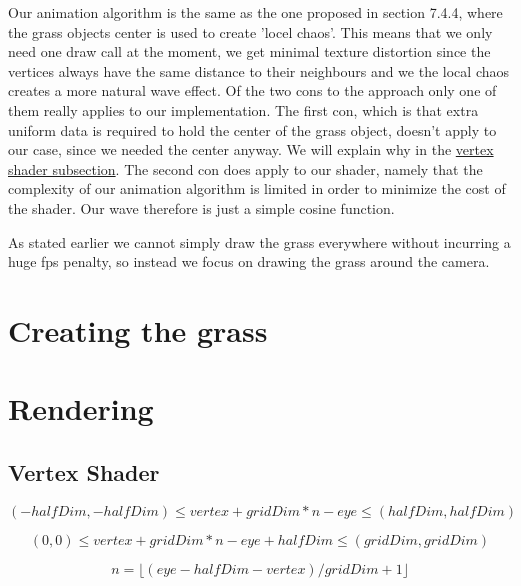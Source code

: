 Our animation algorithm is the same as the one proposed in section
7.4.4, where the grass objects center is used to create 'locel
chaos'. This means that we only need one draw call at the moment, we
get minimal texture distortion since the vertices always have the same
distance to their neighbours and we the local chaos creates a more
natural wave effect. Of the two cons to the approach only one of them
really applies to our implementation. The first con, which is that
extra uniform data is required to hold the center of the grass object,
doesn't apply to our case, since we needed the center anyway. We will
explain why in the \hyperref[sec:grassVert]{vertex shader
  subsection}. The second con does apply to our shader, namely that
the complexity of our animation algorithm is limited in order to
minimize the cost of the shader. Our wave therefore is just a simple
cosine function.

As stated earlier we cannot simply draw the grass everywhere without
incurring a huge fps penalty, so instead we focus on drawing the grass
around the camera. %

\section{Creating the grass}



\section{Rendering}


\subsection{Vertex Shader}\label{sec:grassVert}


\begin{displaymath}
  (-halfDim, -halfDim) \le vertex + gridDim * n - eye \le (halfDim, halfDim)
\end{displaymath}

\begin{displaymath}
  (0, 0) \le vertex + gridDim * n - eye + halfDim \le (gridDim, gridDim)
\end{displaymath}

\begin{displaymath}
  n = \lfloor (eye - halfDim - vertex) / gridDim + 1 \rfloor
\end{displaymath}

